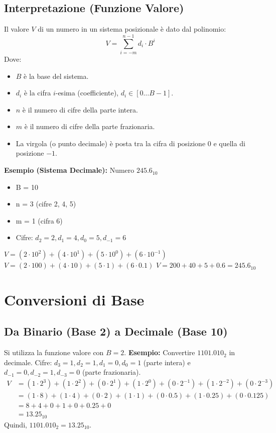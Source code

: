 \subsection{Interpretazione (Funzione Valore)}
Il valore $V$ di un numero in un sistema posizionale è dato dal polinomio:
\[ V = \sum_{i=-m}^{n-1} d_i \cdot B^i \]
Dove:
\begin{itemize}
    \item $B$ è la base del sistema.
    \item $d_i$ è la cifra $i$-esima (coefficiente), $d_i \in [0 \dots B-1]$.
    \item $n$ è il numero di cifre della parte intera.
    \item $m$ è il numero di cifre della parte frazionaria.
    \item La virgola (o punto decimale) è posta tra la cifra di posizione $0$ e quella di posizione $-1$.
\end{itemize}

\textbf{Esempio (Sistema Decimale):} Numero $245.6_{10}$
\begin{itemize}
    \item B = 10
    \item n = 3 (cifre 2, 4, 5)
    \item m = 1 (cifra 6)
    \item Cifre: $d_2=2, d_1=4, d_0=5, d_{-1}=6$
\end{itemize}
$V = (2 \cdot 10^2) + (4 \cdot 10^1) + (5 \cdot 10^0) + (6 \cdot 10^{-1})$
$V = (2 \cdot 100) + (4 \cdot 10) + (5 \cdot 1) + (6 \cdot 0.1)$
$V = 200 + 40 + 5 + 0.6 = 245.6_{10}$

\section{Conversioni di Base}

\subsection{Da Binario (Base 2) a Decimale (Base 10)}
Si utilizza la funzione valore con $B=2$.
\textbf{Esempio:} Convertire $1101.010_2$ in decimale.
Cifre: $d_3=1, d_2=1, d_1=0, d_0=1$ (parte intera) e $d_{-1}=0, d_{-2}=1, d_{-3}=0$ (parte frazionaria).
\begin{align*} V &= (1 \cdot 2^3) + (1 \cdot 2^2) + (0 \cdot 2^1) + (1 \cdot 2^0) + (0 \cdot 2^{-1}) + (1 \cdot 2^{-2}) + (0 \cdot 2^{-3}) \\ &= (1 \cdot 8) + (1 \cdot 4) + (0 \cdot 2) + (1 \cdot 1) + (0 \cdot 0.5) + (1 \cdot 0.25) + (0 \cdot 0.125) \\ &= 8 + 4 + 0 + 1 + 0 + 0.25 + 0 \\ &= 13.25_{10} \end{align*}
Quindi, $1101.010_2 = 13.25_{10}$.

